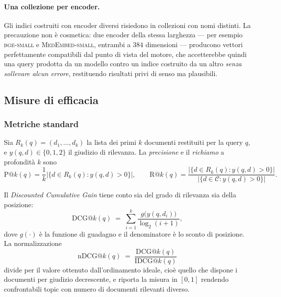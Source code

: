 \documentclass[pdflatex,sn-mathphys-num]{sn-jnl}
\theoremstyle{thmstyleone}
\theoremstyle{thmstyletwo}
\theoremstyle{thmstylethree}
\begin{document}
\paragraph{Una collezione per encoder.} Gli indici costruiti con encoder diversi risiedono in collezioni con nomi distinti. La precauzione non è cosmetica: due encoder della stessa larghezza --- per esempio \textsc{bge-small} e \textsc{MedEmbed-small}, entrambi a $384$ dimensioni --- producono vettori perfettamente compatibili dal punto di vista del motore, che accetterebbe quindi una query prodotta da un modello contro un indice costruito da un altro \emph{senza sollevare alcun errore}, restituendo risultati privi di senso ma plausibili.

\subsection{Misure di efficacia}\label{sec:metriche}

\subsubsection{Metriche standard}\label{sec:metriche-standard}

Sia $R_k(q) = (d_1, \dots, d_k)$ la lista dei primi $k$ documenti restituiti per la query $q$, e $y(q,d) \in \{0,1,2\}$ il giudizio di rilevanza. La \emph{precisione} e il \emph{richiamo} a profondità $k$ sono
\begin{equation}
  \mathrm{P@}k(q) = \frac{1}{k}\big|\{d \in R_k(q) : y(q,d) > 0\}\big|,
  \qquad
  \mathrm{R@}k(q) = \frac{\big|\{d \in R_k(q) : y(q,d) > 0\}\big|}{\big|\{d \in \mathcal{C} : y(q,d) > 0\}\big|}.
  \label{eq:precrec}
\end{equation}

Il \emph{Discounted Cumulative Gain} \cite{jarvelin2002ndcg} tiene conto sia del grado di rilevanza sia della posizione:
\begin{equation}
  \mathrm{DCG@}k(q) \;=\; \sum_{i=1}^{k} \frac{g\big(y(q,d_i)\big)}{\log_2(i+1)},
  \label{eq:dcg}
\end{equation}
dove $g(\cdot)$ è la funzione di guadagno e il denominatore è lo sconto di posizione. La normalizzazione
\begin{equation}
  \mathrm{nDCG@}k(q) \;=\; \frac{\mathrm{DCG@}k(q)}{\mathrm{IDCG@}k(q)}
  \label{eq:ndcg}
\end{equation}
divide per il valore ottenuto dall'ordinamento ideale, cioè quello che dispone i documenti per giudizio decrescente, e riporta la misura in $[0,1]$ rendendo confrontabili topic con numero di documenti rilevanti diverso.
\end{document}

